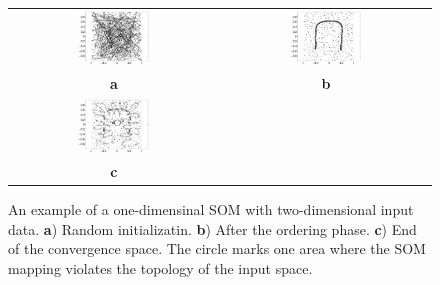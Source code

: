 \begin{enumerate}
\begin{solution}
    \begin{figure}[h]
      \centering
      \begin{tabular}{cc}
        \includegraphics[width=0.35\textwidth]{v121-f1} &
        \includegraphics[width=0.35\textwidth]{v121-f2} \\
        {\bf a} &{\bf b}\\
        \includegraphics[width=0.35\textwidth]{v121-f3f} &\\
        {\bf c} &
      \end{tabular}
      \caption{An example of a one-dimensinal SOM with two-dimensional input
        data.  {\bf a}) Random initializatin. {\bf b}) After the ordering
        phase. {\bf c}) End of the convergence space. The circle marks one
        area where the SOM mapping violates the topology of the input space.}
      \label{fig:som}
    \end{figure}


  \end{solution}

\end{enumerate}

